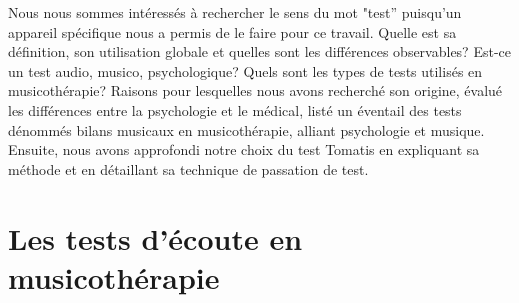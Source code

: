 Nous nous sommes intéressés à rechercher le sens du mot "test'' puisqu'un appareil spécifique nous a permis de le faire pour ce travail. Quelle est sa définition, son utilisation globale et quelles sont les différences observables?
Est-ce un test audio, musico, psychologique?
Quels sont les types de tests utilisés en musicothérapie?
Raisons pour lesquelles nous avons recherché son origine, évalué les différences entre la psychologie et 
le médical, listé un éventail des tests dénommés bilans musicaux en musicothérapie, alliant psychologie 
et musique. Ensuite,  nous avons approfondi notre choix du test Tomatis en expliquant sa méthode et en 
détaillant sa technique de passation de test.


\section{Les  tests d'écoute en musicothérapie} 

